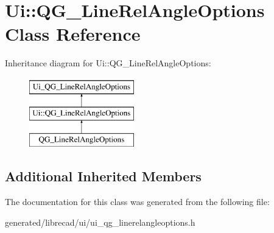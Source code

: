\hypertarget{classUi_1_1QG__LineRelAngleOptions}{\section{Ui\-:\-:Q\-G\-\_\-\-Line\-Rel\-Angle\-Options Class Reference}
\label{classUi_1_1QG__LineRelAngleOptions}
}
Inheritance diagram for Ui\-:\-:Q\-G\-\_\-\-Line\-Rel\-Angle\-Options\-:\begin{figure}[H]
\begin{center}
\leavevmode
\includegraphics[height=3.000000cm]{classUi_1_1QG__LineRelAngleOptions}
\end{center}
\end{figure}
\subsection*{Additional Inherited Members}


The documentation for this class was generated from the following file\-:\begin{DoxyCompactItemize}
\item 
generated/librecad/ui/ui\-\_\-qg\-\_\-linerelangleoptions.\-h\end{DoxyCompactItemize}
